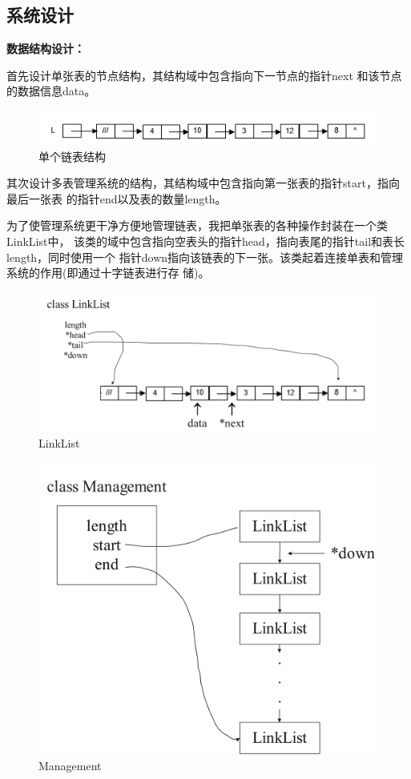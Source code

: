 \documentclass[supercite]{Experimental_Report}
\theoremstyle{definition}
\begin{document}
\subsection{系统设计}
	\noindent \textbf{数据结构设计：}\par
	首先设计单张表的节点结构，其结构域中包含指向下一节点的指针next
	和该节点的数据信息data。\par
	\begin{figure}[H]
		\centering
		\includegraphics[scale=0.6]{images/SingleList.png}
		\caption{单个链表结构}
	\end{figure}
	其次设计多表管理系统的结构，其结构域中包含指向第一张表的指针start，指向最后一张表
	的指针end以及表的数量length。\par
	为了使管理系统更干净方便地管理链表，我把单张表的各种操作封装在一个类LinkList中，
	该类的域中包含指向空表头的指针head，指向表尾的指针tail和表长length，同时使用一个
	指针down指向该链表的下一张。该类起着连接单表和管理系统的作用(即通过十字链表进行存
	储)。\par
	\begin{figure}[H]
		\centering
		\includegraphics[scale=0.5]{images/LinkList.png}
		\caption{LinkList}
	\end{figure}
	\begin{figure}[H]
		\centering
		\includegraphics[scale=0.4]{images/Management.png}
		\caption{Management}
	\end{figure}
\end{document}
